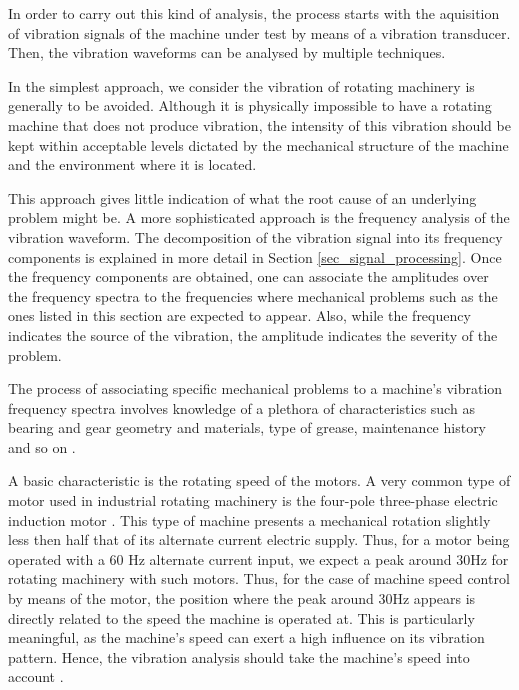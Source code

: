 \documentclass[conference]{IEEEtran}
\begin{document}
In order to carry out this kind of analysis, the process starts with the aquisition of vibration signals of the machine under test by means of a vibration transducer. Then, the vibration waveforms can be analysed by multiple techniques.

In the simplest approach, we consider the vibration of rotating machinery is generally to be avoided. Although it is physically impossible to have a rotating machine that does not produce vibration, the intensity of this vibration should be kept within acceptable levels dictated by the mechanical structure of the machine and the environment where it is located.

This approach gives little indication of what the root cause of an underlying problem might be. A more sophisticated approach is the frequency analysis of the vibration waveform. The decomposition of the vibration signal into its frequency components is explained in more detail in Section \ref{sec_signal_processing}. Once the frequency components are obtained, one can associate the amplitudes over the frequency spectra to the frequencies where mechanical problems such as the ones listed in this section are expected to appear. Also, while the frequency indicates the source of the vibration, the amplitude indicates the severity of the problem.

The process of associating specific mechanical problems to a machine’s vibration frequency spectra involves knowledge of a plethora of characteristics such as bearing and gear geometry and materials, type of grease, maintenance history and so on \cite{b1}.

A basic characteristic is the rotating speed of the motors. A very common type of motor used in industrial rotating machinery is the four-pole three-phase electric induction motor \cite{b2}. This type of machine presents a mechanical rotation slightly less then half that of its alternate current electric supply. Thus, for a motor being operated with a 60 Hz alternate current input, we expect a peak around 30Hz for rotating machinery with such motors. Thus, for the case of machine speed control by means of the motor, the position where the peak around 30Hz appears is directly related to the speed the machine is operated at. This is particularly meaningful, as the machine’s speed can exert a high influence on its vibration pattern. Hence, the vibration analysis should take the machine’s speed into account \cite{b3}.


\end{document}
